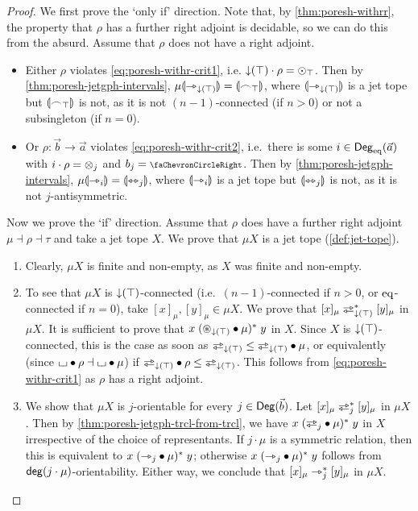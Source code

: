 \documentclass[a4paper]{memoir}
\begin{document}
\begin{proof}
	We first prove the `only if' direction.
	Note that, by \cref{thm:poresh-withrr}, the property that $\rho$ has a further right adjoint is decidable, so we can do this from the absurd.
	Assume that $\rho$ does not have a right adjoint.
	\begin{itemize}
		\item Either $\rho$ violates \cref{eq:poresh-withr-crit1}, i.e. ${\downarrow}(\top) \cdot \rho = {\odot}_\top$.
		Then by \cref{thm:poresh-jetgph-intervals}, $\mu {\llparenthesis {\rightarrowtriangle}_{{\downarrow}(\top)} \rrparenthesis} = {\llparenthesis {\frown}_\top \rrparenthesis}$, where ${\llparenthesis {\rightarrowtriangle}_{{\downarrow}(\top)} \rrparenthesis}$ is a jet tope but ${\llparenthesis {\frown}_\top \rrparenthesis}$ is not, as it is not $(n-1)$-connected (if $n > 0$) or not a subsingleton (if $n = 0$).
		\item Or $\rho : \vec b \to \vec a$ violates \cref{eq:poresh-withr-crit2}, i.e.\ there is some $i \in {\mathsf{Deg}_{\mathrm{eq}}}(\vec a)$ with $i \cdot \rho = {\otimes}_j$ and $b_j = \ypolar$.
		Then by \cref{thm:poresh-jetgph-intervals}, $\mu {\llparenthesis {\rightarrowtriangle}_i \rrparenthesis} = {\llparenthesis {\leftrightarrowtriangle}_j \rrparenthesis}$, where ${\llparenthesis {\rightarrowtriangle}_i \rrparenthesis}$ is a jet tope but ${\llparenthesis {\leftrightarrowtriangle}_j \rrparenthesis}$ is not, as it is not $j$-antisymmetric.
	\end{itemize}
	
	Now we prove the `if' direction.
	Assume that $\rho$ does have a further right adjoint $\mu \dashv \rho \dashv \tau$ and take a jet tope $X$.
	We prove that $\mu X$ is a jet tope (\cref{def:jet-tope}).
	\begin{enumerate}
		\item Clearly, $\mu X$ is finite and non-empty, as $X$ was finite and non-empty.
		
		\item To see that $\mu X$ is ${\downarrow}(\top)$-connected (i.e.\ $(n-1)$-connected if $n > 0$, or ${\mathrm{eq}}$-connected if $n = 0$), take $[x]_\mu, [y]_\mu \in \mu X$.
		We prove that $[x]_\mu \infrajet_{\predeg(\top)}^* [y]_\mu$ in $\mu X$.
		It is sufficient to prove that $x \mathrel{({\oast}_{{\downarrow}(\top)} \mathbin{\bullet} \mu)^*} y$ in $X$.
		Since $X$ is ${\downarrow}(\top)$-connected, this is the case as soon as $\infrajetsym_{\predeg(\top)} \leq \infrajetsym_{\predeg(\top)} \oriof \mu$, or equivalently (since ${\llcorner\hspace{-.4ex}\lrcorner} \mathbin{\bullet} \rho \dashv {\llcorner\hspace{-.4ex}\lrcorner} \mathbin{\bullet} \mu$) if $\infrajetsym_{\predeg(\top)} \oriof \rho \leq \infrajetsym_{\predeg(\top)}$.
		This follows from \cref{eq:poresh-withr-crit1} as $\rho$ has a right adjoint.
		
		\item We show that $\mu X$ is $j$-orientable for every $j \in {\mathsf{Deg}}(\vec b)$. Let $[x]_\mu \infrajet_j^* [y]_\mu$ in $\mu X$.
		Then by \cref{thm:poresh-jetgph-trcl-from-trcl}, we have $x \mathrel{(\infrajetsym_j \oriof \mu)^*} y$ in $X$ irrespective of the choice of representants.
		If $j \cdot \mu$ is a symmetric relation, then this is equivalent to $x \mathrel{({\rightarrowtriangle}_j \mathbin{\bullet} \mu)^*} y$; otherwise $x \mathrel{({\rightarrowtriangle}_j \mathbin{\bullet} \mu)^*} y$ follows from $\mathsf{deg}(j \cdot \mu)$-orientability.
		Either way, we conclude that $[x]_\mu \rightarrowtriangle_j^* [y]_\mu$ in $\mu X$.
		

\end{enumerate}
\end{proof}
\end{document}
